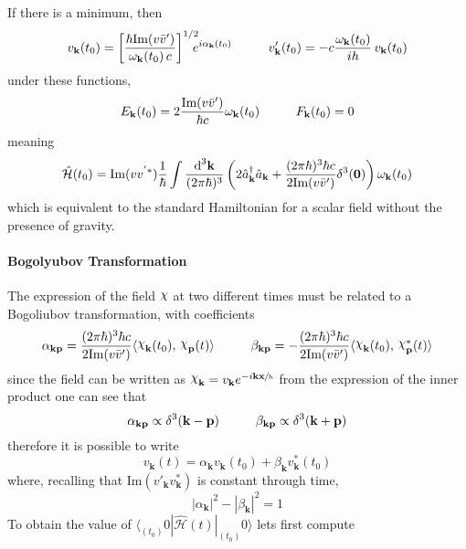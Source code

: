 If there is a minimum, then
\begin{equation}
	v_\mathbf{k}(t_0)=\left[\frac{\hbar\text{Im}(v\bar v')}{\omega_\mathbf{k}(t_0)\,c}\right]^{1/2}\!\!\!\!e^{i\alpha_\mathbf{k}(t_0)}\hspace{1.0cm}v'_\mathbf{k}(t_0)=-c\frac{\omega_\mathbf{k}(t_0)}{ih}\,v_\mathbf{k}(t_0)
\end{equation}
under these functions,
\begin{equation}
	E_\mathbf{k}(t_0)=2\frac{\text{Im}(v\bar v')}{\hbar c}\omega_\mathbf{k}(t_0)\hspace{1.0cm}F_\mathbf{k}(t_0)=0
\end{equation}
meaning
\begin{equation}
	\hat{\mathcal{H}}(t_0)=\text{Im}(vv^{'*})\frac{1}{\hbar}\int\frac{\text{d}^3\mathbf{k}}{(2\pi\hbar)^3}\left(2\hat{a}_\mathbf{k}^\dagger\hat{a}_\mathbf{k}+\frac{(2\pi\hbar)^3\hbar c}{2\text{Im}(v\bar v')}\delta^3(\mathbf{0})\right)\omega_\mathbf{k}(t_0)
\end{equation}
which is equivalent to the standard Hamiltonian for a scalar field without the presence of gravity.
\paragraph{Bogolyubov Transformation}

The expression of the field $\rchi$ at two different times must be related to a Bogoliubov transformation, with coefficients
\begin{equation}
	\alpha_{\mathbf{kp}}=\frac{(2\pi\hbar)^3\hbar c}{2\text{Im}(v\bar v')}\langle \rchi_\mathbf{k}(t_0),\,\rchi_\mathbf{p}(t)\rangle\hspace{1.0cm}\beta_{\mathbf{kp}}=-\frac{(2\pi\hbar)^3\hbar c}{2\text{Im}(v\bar v')}\langle \rchi_\mathbf{k}(t_0),\,\rchi_\mathbf{p}^*(t)\rangle
\end{equation}
since the field can be written as $\rchi_\mathbf{k}=v_\mathbf{k}e^{-i\mathbf{kx}\sfrac{}{h}}$ from the expression of the inner product one can see that
\begin{equation}
	\alpha_{\mathbf{kp}}\propto \delta^3(\mathbf{k}-\mathbf{p})\hspace{1.0cm}\beta_{\mathbf{kp}}\propto \delta^3(\mathbf{k}+\mathbf{p})
\end{equation}
therefore it is possible to write
\begin{equation}
	v_\mathbf{k}(t)=\alpha_\mathbf{k}v_\mathbf{k}(t_0)+\beta_\mathbf{k}v^*_\mathbf{k}(t_0)
\end{equation}
where, recalling that $\text{Im}(v'_\mathbf{k}v^*_\mathbf{k})$ is constant through time, 
\begin{equation}
	|\alpha_\mathbf{k}|^2-|\beta_\mathbf{k}|^2=1
\end{equation}
To obtain the value of $\langle_{(t_0)}0|\hat{\mathcal{H}}(t)|_{(t_0)}0\rangle$ lets first compute



